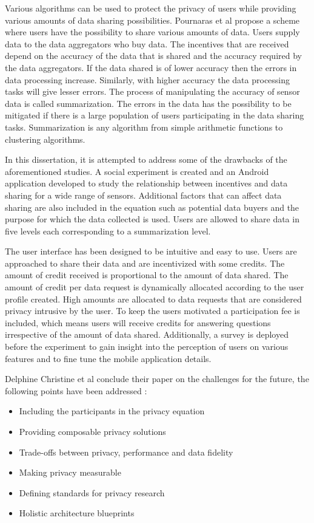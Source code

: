 Various algorithms can be used to protect the privacy of users while providing various amounts of data sharing possibilities. Pournaras et al \cite{pournaras2016self} propose a scheme where users have the possibility to share various amounts of data. Users supply data to the data aggregators who buy data. The incentives that are received depend on the accuracy of the data that is shared and the accuracy required by the data aggregators. If the data shared is of lower accuracy then the errors in data processing increase. Similarly, with higher accuracy the data processing tasks will give lesser errors. The process of manipulating the accuracy of sensor data is called summarization. The errors in the data has the possibility to be mitigated if there is a large population of users participating in the data sharing tasks. Summarization is any algorithm from simple arithmetic functions to clustering algorithms.

In this dissertation, it is attempted to address some of the drawbacks of the aforementioned studies. A social experiment is created and an Android application developed to study the relationship between incentives and data sharing for a wide range of sensors.
Additional factors that can affect data sharing are also included in the equation such as potential data buyers and the purpose for which the data collected is used. Users are allowed to share data in five levels each corresponding to a summarization level. 

The user interface has been designed to be intuitive and easy to use. Users are approached to share their data and are incentivized with some credits. The amount of credit received is proportional to the amount of data shared. The amount of credit per data request is dynamically allocated according to the user profile created. High amounts are allocated to data requests that are considered privacy intrusive by the user. To keep the users motivated a participation fee is included, which means users will receive credits for answering questions irrespective of the amount of data shared.
Additionally, a survey is deployed before the experiment to gain insight into the perception of users on various features and to fine tune the mobile application details.

Delphine Christine et al \cite{christin2016privacy} conclude their paper on the challenges for the future, the following points have been addressed \cite{pournarasethical}:

\begin{itemize}
\item Including the participants in the privacy equation
\item Providing composable privacy solutions
\item Trade-offs between privacy, performance and data fidelity
\item Making privacy measurable
\item Defining standards for privacy research
\item Holistic architecture blueprints
\end{itemize}



